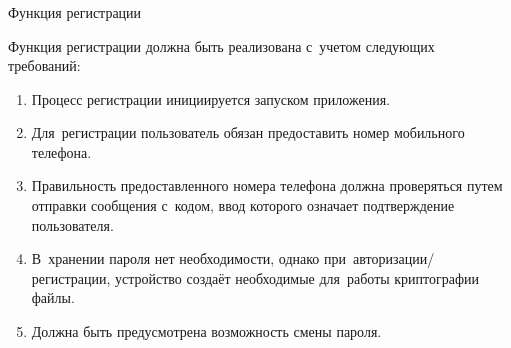 \subsubsection{} Функция регистрации
\label{sec:analysis:research:funcreq:registration}

Функция регистрации должна быть реализована с~учетом следующих требований:

\begin{enumerate}
	\item Процесс регистрации инициируется запуском приложения.
	\item Для~регистрации пользователь обязан предоставить номер мобильного телефона.
	\item Правильность предоставленного номера телефона должна проверяться путем отправки сообщения с~кодом, ввод которого означает подтверждение пользователя.
	\item В~хранении пароля нет необходимости, однако при~авторизации/регистрации, устройство создаёт необходимые для~работы криптографии файлы.
	\item Должна быть предусмотрена возможность смены пароля.
\end{enumerate}